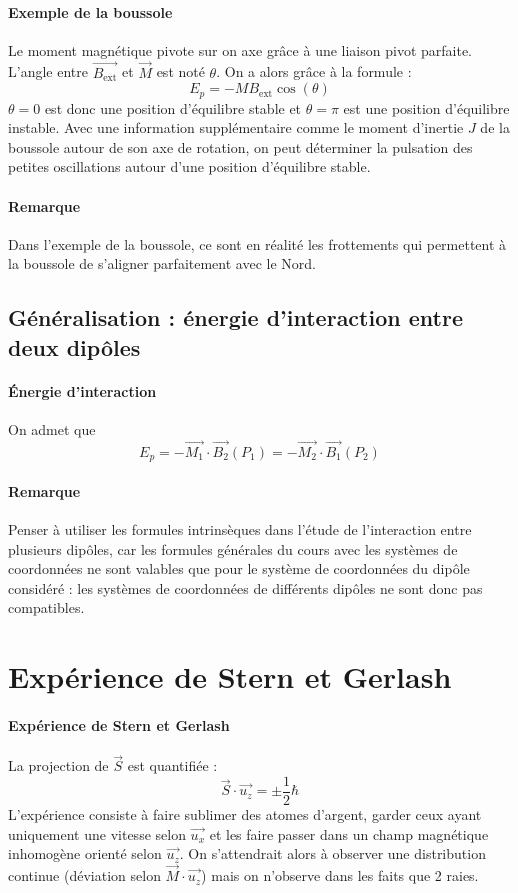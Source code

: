 \documentclass[french]{book}
\theoremstyle{plain}
\theoremstyle{definition}
\theoremstyle{remark}
\begin{document}
\paragraph{Exemple de la boussole} Le moment magnétique pivote sur on axe grâce à une liaison pivot parfaite. L'angle entre $\overrightarrow{B_\text{ext}}$ et $\overrightarrow{M}$ est noté $\theta$. On a alors grâce à la formule : $$E_p=-MB_\text{ext}\cos(\theta)$$ $\theta=0$ est donc une position d'équilibre stable et $\theta=\pi$ est une position d'équilibre instable. Avec une information supplémentaire comme le moment d'inertie $J$ de la boussole autour de son axe de rotation, on peut déterminer la pulsation des petites oscillations autour d'une position d'équilibre stable.
\paragraph{Remarque} Dans l'exemple de la boussole, ce sont en réalité les frottements qui permettent à la boussole de s'aligner parfaitement avec le Nord.
\subsection{Généralisation : énergie d'interaction entre deux dipôles}
\paragraph{Énergie d'interaction} On admet que $$E_p=-\overrightarrow{M_1}\cdot\overrightarrow{B_2}(P_1)=-\overrightarrow{M_2}\cdot\overrightarrow{B_1}(P_2)$$
\paragraph{Remarque} Penser à utiliser les formules intrinsèques dans l'étude de l'interaction entre plusieurs dipôles, car les formules générales du cours avec les systèmes de coordonnées ne sont valables que pour le système de coordonnées du dipôle considéré : les systèmes de coordonnées de différents dipôles ne sont donc pas compatibles.
\section{Expérience de Stern et Gerlash}
\paragraph{Expérience de Stern et Gerlash} La projection de $\overrightarrow{S}$ est quantifiée : $$\overrightarrow{S}\cdot\overrightarrow{u_z}=\pm\frac{1}{2}\hbar$$ L'expérience consiste à faire sublimer des atomes d'argent, garder ceux ayant uniquement une vitesse selon $\overrightarrow{u_x}$ et les faire passer dans un champ magnétique inhomogène orienté selon $\overrightarrow{u_z}$. On s'attendrait alors à observer une distribution continue (déviation selon $\overrightarrow{M}\cdot\overrightarrow{u_z}$) mais on n'observe dans les faits que 2 raies.
\end{document}
